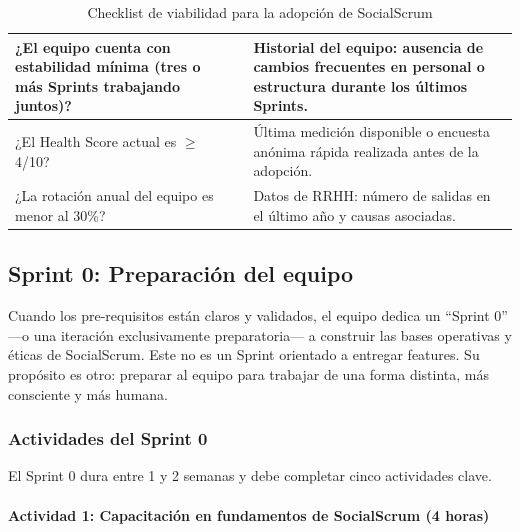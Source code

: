 \begin{table}[h]
\begin{tabularx}{\textwidth}{|X|c|X|}
        \hline
        ¿El equipo cuenta con estabilidad mínima (tres o más Sprints trabajando juntos)?
                          &
                          & Historial del equipo: ausencia de cambios frecuentes en personal o estructura durante los últimos Sprints.                                                  \\
        \hline
        ¿El Health Score actual es $\geq$ 4/10?
                          &
                          & Última medición disponible o encuesta anónima rápida realizada antes de la adopción.                                                                        \\
        \hline
        ¿La rotación anual del equipo es menor al 30\%?
                          &
                          & Datos de RRHH: número de salidas en el último año y causas asociadas.                                                                                       \\
        \hline
    \end{tabularx}
    \caption{Checklist de viabilidad para la adopción de SocialScrum}
    \label{tab:checklist-viabilidad}
\end{table}

\FloatBarrier

\subsection{Sprint 0: Preparación del equipo}

Cuando los pre-requisitos están claros y validados, el equipo dedica un “Sprint 0” —o una iteración exclusivamente preparatoria— a construir las bases operativas y éticas de SocialScrum. Este no es un Sprint orientado a entregar features. Su propósito es otro: preparar al equipo para trabajar de una forma distinta, más consciente y más humana.

\subsubsection{Actividades del Sprint 0}

El Sprint 0 dura entre 1 y 2 semanas y debe completar cinco actividades clave.

\paragraph{Actividad 1: Capacitación en fundamentos de SocialScrum (4 horas)}

